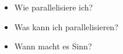 \begin{frame}
	\begin{itemize}
		\item Wie parallelisiere ich?
		\item Was kann ich parallelisieren?
		\item Wann macht es Sinn?
	\end{itemize}
\end{frame}